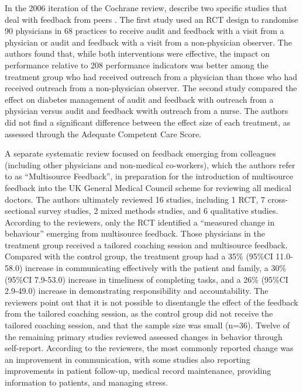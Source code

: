 \documentclass[12pt]{article}
\begin{document}
In the 2006 iteration of the Cochrane review, \citet{jamtvedtAuditFeedbackEffects2006} describe two specific studies that deal with feedback from peers \citep{jamtvedtDoesTellingPeople2006}. The first study \citep{homberghPracticeVisitsTool1999} used an RCT design to randomise 90 physicians in 68 practices to receive audit and feedback with a visit from a physician or audit and feedback with a visit from a non-physician observer. The authors found that, while both interventions were effective, the impact on performance relative to 208 performance indicators was better among the treatment group who had received outreach from a physician than those who had received outreach from a non-physician observer. The second study \citep{wardEducationalFeedbackManagement1996} compared the effect on diabetes management of audit and feedback with outreach from a physician versus audit and feedback wwith outreach from a nurse. The authors did not find a significant difference between the effect size of each treatment, as assessed through the Adequate Competent Care Score.

A separate systematic review \citep{fergusonFactorsInfluencingEffectiveness2014} focused on feedback emerging from colleagues (including other physicians and non-medical co-workers), which the authors refer to as ``Multisource Feedback'', in preparation for the introduction of multisource feedback into the UK General Medical Council scheme for reviewing all medical doctors. The authors ultimately reviewed 16 studies, including 1 RCT, 7 cross-sectional survey studies, 2 mixed methods studies, and 6 qualitative studies. According to the reviewers, only the RCT identified a ``measured change in behaviour'' emerging from multisource feedback. Those physicians in the treatment group received a tailored coaching session and multisource feedback. Compared with the control group, the treatment group had a 35\% (95\%CI 11.0-58.0) increase in communicating effectively with the patient and family, a 30\% (95\%CI 7.9-53.0) increase in timeliness of completing tasks, and a 26\% (95\%CI 2.9-49.0) increase in demonstrating responsibility and accountability. The reviewers point out that it is not possible to disentangle the effect of the feedback from the tailored coaching session, as the control group did not receive the tailored coaching session, and that the sample size was small (n=36). Twelve of the remaining primary studies reviewed assessed changes in behavior through self-report. According to the reviewers, the most commonly reported change was an improvement in communication, with some studies also reporting improvements in patient follow-up, medical record maintenance, providing information to patients, and managing stress.
\end{document}
